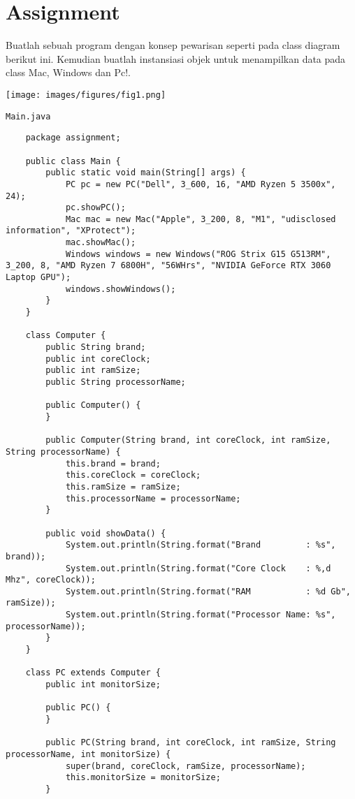 \documentclass[12pt,titlepage]{article}
\begin{document}
\newpage

\section{Assignment}
\noindent
Buatlah sebuah program dengan konsep pewarisan seperti pada class diagram berikut ini. Kemudian buatlah instansiasi objek untuk menampilkan data pada class Mac, Windows dan Pc!.
\begin{center}
    \texttt{[image: images/figures/fig1.png]}
\end{center}

\texttt{Main.java}
\begin{verbatim}
    package assignment;

    public class Main {
        public static void main(String[] args) {
            PC pc = new PC("Dell", 3_600, 16, "AMD Ryzen 5 3500x", 24);
            pc.showPC();
            Mac mac = new Mac("Apple", 3_200, 8, "M1", "udisclosed information", "XProtect");
            mac.showMac();
            Windows windows = new Windows("ROG Strix G15 G513RM", 3_200, 8, "AMD Ryzen 7 6800H", "56WHrs", "NVIDIA GeForce RTX 3060 Laptop GPU");
            windows.showWindows();
        }
    }

    class Computer {
        public String brand;
        public int coreClock;
        public int ramSize;
        public String processorName;

        public Computer() {
        }

        public Computer(String brand, int coreClock, int ramSize, String processorName) {
            this.brand = brand;
            this.coreClock = coreClock;
            this.ramSize = ramSize;
            this.processorName = processorName;
        }

        public void showData() {
            System.out.println(String.format("Brand         : %s", brand));
            System.out.println(String.format("Core Clock    : %,d Mhz", coreClock));
            System.out.println(String.format("RAM           : %d Gb", ramSize));
            System.out.println(String.format("Processor Name: %s", processorName));
        }
    }

    class PC extends Computer {
        public int monitorSize;
        
        public PC() {
        }
        
        public PC(String brand, int coreClock, int ramSize, String processorName, int monitorSize) {
            super(brand, coreClock, ramSize, processorName);
            this.monitorSize = monitorSize;
        }
        

\end{verbatim}
\end{document}
